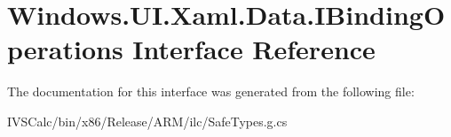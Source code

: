 \hypertarget{interface_windows_1_1_u_i_1_1_xaml_1_1_data_1_1_i_binding_operations}{}\section{Windows.\+U\+I.\+Xaml.\+Data.\+I\+Binding\+Operations Interface Reference}
\label{interface_windows_1_1_u_i_1_1_xaml_1_1_data_1_1_i_binding_operations}


The documentation for this interface was generated from the following file\+:\begin{DoxyCompactItemize}
\item 
I\+V\+S\+Calc/bin/x86/\+Release/\+A\+R\+M/ilc/Safe\+Types.\+g.\+cs\end{DoxyCompactItemize}
